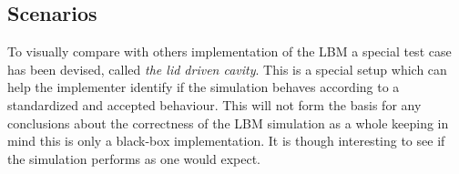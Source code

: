 \subsection{Scenarios}
To visually compare with others implementation of the LBM a special test case has been devised, called \emph{the lid driven cavity}. This is a special setup which can help the implementer identify if the simulation behaves according to a standardized and accepted behaviour. This will not form the basis for any conclusions about the correctness of the LBM simulation as a whole keeping in mind this is only a black-box implementation. It is though interesting to see if the simulation performs as one would expect.